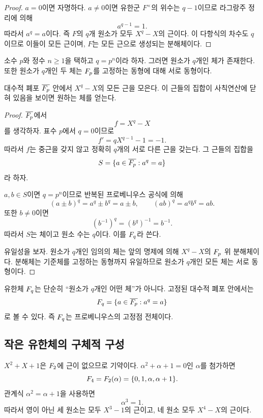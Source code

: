 \begin{proof}
$a=0$이면 자명하다. $a\ne0$이면 유한군 $F^\times$의 위수는 $q-1$이므로 라그랑주 정리에 의해
\[
  a^{q-1}=1.
\]
따라서 $a^q=a$이다. 즉 $F$의 $q$개 원소가 모두 $X^q-X$의 근이다. 이 다항식의 차수도 $q$이므로 이들이 모든 근이며, $F$는 모든 근으로 생성되는 분해체이다.
\end{proof}

\begin{theorem}
소수 $p$와 정수 $n\ge1$을 택하고 $q=p^n$이라 하자. 그러면 원소가 $q$개인 체가 존재한다. 또한 원소가 $q$개인 두 체는 $F_p$를 고정하는 동형에 대해 서로 동형이다.
\end{theorem}

\begin{proofidea}
대수적 폐포 $\overline{F_p}$ 안에서 $X^q-X$의 모든 근을 모은다. 이 근들의 집합이 사칙연산에 닫혀 있음을 보이면 원하는 체를 얻는다.
\end{proofidea}

\begin{proof}
$\overline{F_p}$에서
\[
  f=X^q-X
\]
를 생각하자. 표수 $p$에서 $q=0$이므로
\[
  f'=qX^{q-1}-1=-1.
\]
따라서 $f$는 중근을 갖지 않고 정확히 $q$개의 서로 다른 근을 갖는다. 그 근들의 집합을
\[
  S=\{a\in\overline{F_p}:a^q=a\}
\]
라 하자.

$a,b\in S$이면 $q=p^n$이므로 반복된 프로베니우스 공식에 의해
\[
  (a\pm b)^q=a^q\pm b^q=a\pm b,
  \qquad
  (ab)^q=a^qb^q=ab.
\]
또한 $b\ne0$이면
\[
  (b^{-1})^q=(b^q)^{-1}=b^{-1}.
\]
따라서 $S$는 체이고 원소 수는 $q$이다. 이를 $F_q$라 쓴다.

유일성을 보자. 원소가 $q$개인 임의의 체는 앞의 명제에 의해 $X^q-X$의 $F_p$ 위 분해체이다. 분해체는 기준체를 고정하는 동형까지 유일하므로 원소가 $q$개인 모든 체는 서로 동형이다.
\end{proof}

\begin{keyidea}
유한체 $F_q$는 단순히 ``원소가 $q$개인 어떤 체''가 아니다. 고정된 대수적 폐포 안에서는
\[
  F_q=\{a\in\overline{F_p}:a^q=a\}
\]
로 볼 수 있다. 즉 $F_q$는 프로베니우스의 고정점 전체이다.
\end{keyidea}

\subsection{작은 유한체의 구체적 구성}

\begin{example}[네 원소 체]
$X^2+X+1$은 $F_2$에 근이 없으므로 기약이다. $\alpha^2+\alpha+1=0$인 $\alpha$를 첨가하면
\[
  F_4=F_2(\alpha)
  =\{0,1,\alpha,\alpha+1\}.
\]
관계식 $\alpha^2=\alpha+1$을 사용하면
\[
  \alpha^3=1.
\]
따라서 영이 아닌 세 원소는 모두 $X^3-1$의 근이고, 네 원소 모두 $X^4-X$의 근이다.
\end{example}

